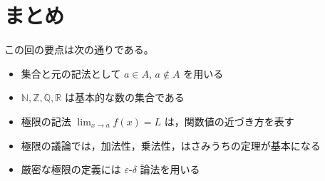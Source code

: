 \documentclass[a4paper,12pt]{jsarticle}
\theoremstyle{definition}
\begin{document}
\section*{まとめ}

この回の要点は次の通りである。
\begin{itemize}
\item 集合と元の記法として $a \in A$, $a \notin A$ を用いる
\item $\mathbb{N},\mathbb{Z},\mathbb{Q},\mathbb{R}$ は基本的な数の集合である
\item 極限の記法 $\lim_{x \to a} f(x)=L$ は，関数値の近づき方を表す
\item 極限の議論では，加法性，乗法性，はさみうちの定理が基本になる
\item 厳密な極限の定義には $\varepsilon$-$\delta$ 論法を用いる
\end{itemize}
\end{document}
